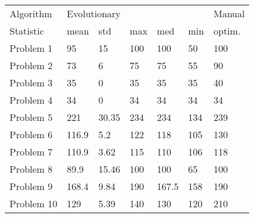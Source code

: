 \begin{tabular}{lllllll}
\toprule
Algorithm & \multicolumn{5}{l}{Evolutionary} & Manual \\
Statistic &         mean &    std &  max &    med &  min & optim. \\
\midrule
Problem 1  &           95 &     15 &  100 &    100 &   50 &    100 \\
Problem 2  &           73 &      6 &   75 &     75 &   55 &     90 \\
Problem 3  &           35 &      0 &   35 &     35 &   35 &     40 \\
Problem 4  &           34 &      0 &   34 &     34 &   34 &     34 \\
Problem 5  &          221 &  30.35 &  234 &    234 &  134 &    239 \\
Problem 6  &        116.9 &    5.2 &  122 &    118 &  105 &    130 \\
Problem 7  &        110.9 &   3.62 &  115 &    110 &  106 &    118 \\
Problem 8  &         89.9 &  15.46 &  100 &    100 &   65 &    100 \\
Problem 9  &        168.4 &   9.84 &  190 &  167.5 &  158 &    190 \\
Problem 10 &          129 &   5.39 &  140 &    130 &  120 &    210 \\
\bottomrule
\end{tabular}
